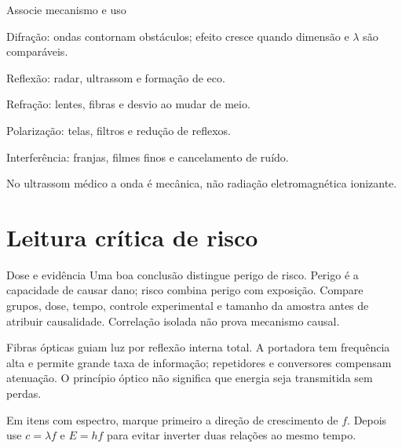 \documentclass{notaaula}
\begin{document}
\begin{copiar}{Associe mecanismo e uso}
\begin{itens}
\item Difração: ondas contornam obstáculos; efeito cresce quando dimensão e $\lambda$ são comparáveis.
\item Reflexão: radar, ultrassom e formação de eco.
\item Refração: lentes, fibras e desvio ao mudar de meio.
\item Polarização: telas, filtros e redução de reflexos.
\item Interferência: franjas, filmes finos e cancelamento de ruído.
\end{itens}
No ultrassom médico a onda é mecânica, não radiação eletromagnética ionizante.
\end{copiar}

\section{Leitura crítica de risco}

\begin{copiar}{Dose e evidência}
Uma boa conclusão distingue perigo de risco. Perigo é a capacidade de causar dano; risco combina
perigo com exposição. Compare grupos, dose, tempo, controle experimental e tamanho da amostra antes
de atribuir causalidade. Correlação isolada não prova mecanismo causal.
\end{copiar}

\begin{exemplo}
Fibras ópticas guiam luz por reflexão interna total. A portadora tem frequência alta e permite grande
taxa de informação; repetidores e conversores compensam atenuação. O princípio óptico não significa
que energia seja transmitida sem perdas.
\end{exemplo}

\begin{dica}
Em itens com espectro, marque primeiro a direção de crescimento de $f$. Depois use
$c=\lambda f$ e $E=hf$ para evitar inverter duas relações ao mesmo tempo.
\end{dica}
\end{document}
